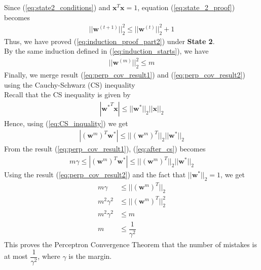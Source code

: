 Since (\ref{eq:state2_conditions}) and $\textbf{x}^T\textbf{x} = 1$, equation (\ref{eq:state_2_proof}) becomes
\begin{align}
  ||{\textbf{w}^{(t+1)}}||_{2}^{2} \leq ||{\textbf{w}^{(t)}}||_{2}^{2} + 1
\end{align}
Thus, we have proved (\ref{eq:induction_proof_part2}) under \textbf{State 2}.\\
By the same induction defined in (\ref{eq:induction_starts}), we have
\begin{align}
  \label{eq:perp_cov_result2}
  ||\textbf{w}^{(m)}||_{2}^{2} \leq m
\end{align}
Finally, we merge result (\ref{eq:perp_cov_result1}) and (\ref{eq:perp_cov_result2}) using the Cauchy-Schwarz (CS) inequality \\
Recall that the CS inequality is given by
\begin{align}
  \label{eq:CS_inquality}
  |{\textbf{w}^*}^T\textbf{x}| \leq ||\textbf{w}^{*}||_2 ||\textbf{x}||_2
\end{align}
Hence, using (\ref{eq:CS_inquality}) we get
\begin{align}
  \label{eq:after_cs}
  |(\textbf{w}^{m})^T\textbf{w}^{*}| \leq ||(\textbf{w}^{m})^T||_2  ||\textbf{w}^{*}||_2
\end{align}
From the result (\ref{eq:perp_cov_result1}), (\ref{eq:after_cs}) becomes
\begin{align}
  m\gamma \leq |(\textbf{w}^{m})^T\textbf{w}^{*}| \leq ||(\textbf{w}^{m})^T||_2  ||\textbf{w}^{*}||_2
\end{align}
Using the result (\ref{eq:perp_cov_result2}) and the fact that $||\textbf{w}^{*}||_{2} = 1$, we get
\begin{align}
  \nonumber
  m\gamma &\leq ||(\textbf{w}^{m})^T||_2 \\
  m^2 {\gamma}^2 &\leq ||(\textbf{w}^{m})^T||_{2}^{2} \\
  m^2 {\gamma}^2 &\leq m \\
  m &\leq \dfrac{1}{\gamma^2}
\end{align}
This proves the Perceptron Convergence Theorem that the number of mistakes is at most $\dfrac{1}{\gamma^2}$, where $\gamma$ is the margin.\vspace{5mm}
